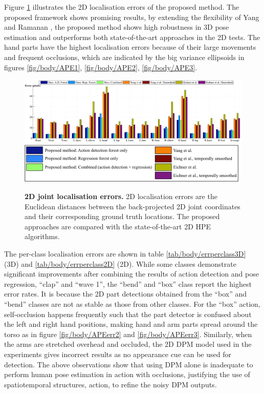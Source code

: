 Figure \ref{fig/body/errorplot2d} illustrates the 2D localisation errors of the proposed method.
The proposed framework shows promising results, by extending the flexibility of Yang and Ramanan \cite{Yang2011}, the proposed method shows high robustness in 3D pose estimation and outperforms both state-of-the-art approaches in the 2D tests. The hand parts have the highest localisation errors because of their large movements and frequent occlusions, which are indicated by the big variance ellipsoids in figures \ref{fig/body/APE1}, \ref{fig/body/APE2}, \ref{fig/body/APE3}.

\begin{figure}
	\centering
	\includegraphics[width=0.9\linewidth, trim = {0 0 0 8mm}, clip]{fig/body/errplot2d.pdf} 
	\includegraphics[width=0.7\linewidth]{fig/body/legend_big.pdf} 
	\caption{\textbf{2D joint localisation errors.} 2D localisation errors are the Euclidean distances between the back-projected 2D joint coordinates and their corresponding ground truth locations. The proposed approaches are compared with the state-of-the-art 2D HPE algorithms.}
\label{fig/body/errorplot2d}
\end{figure} 





The per-class localisation errors are shown in table \ref{tab/body/errperclass3D} (3D) and \ref{tab/body/errperclass2D} (2D). While some classes demonstrate significant improvements after combining the results of action detection and pose regression, \eg ``clap'' and ``wave 1'', the ``bend'' and ``box'' class report the highest error rates. It is because the 2D part detections obtained from the ``box'' and ``bend'' classes are not as stable as those from other classes. For the ``box'' action, self-occlusion happens frequently such that the part detector is confused about the left and right hand positions, making hand and arm parts spread around the torso as in figure \ref{fig/body/APEerr2} and \ref{fig/body/APEerr3}. 
Similarly, when the arms are stretched overhead and occluded, the 2D DPM model used in the experiments gives incorrect results as no appearance cue can be used for detection. The above observations show that using DPM alone is inadequate to perform human pose estimation in action with occlusions, justifying the use of spatiotemporal structures, \ie action, to refine the noisy DPM outputs.  


